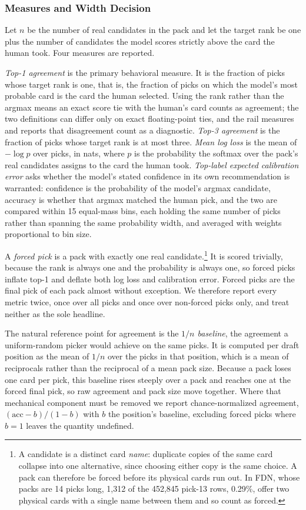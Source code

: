 \documentclass[11pt]{article}
\numberwithin{equation}{section}
\begin{document}
\subsubsection{Measures and Width Decision}
\label{sec:evaluation-measures}

Let $n$ be the number of real candidates in the pack and let the target rank be
one plus the number of candidates the model scores strictly above the card the
human took. Four measures are reported.

\emph{Top-1 agreement} is the primary behavioral measure. It is the fraction of
picks whose target rank is one, that is, the fraction of picks on which the
model's most probable card is the card the human selected. Using the rank rather
than the argmax means an exact score tie with the human's card counts as
agreement; the two definitions can differ only on exact floating-point ties, and
the rail measures and reports that disagreement count as a diagnostic.
\emph{Top-3 agreement} is the fraction of picks whose target rank is at most
three. \emph{Mean log loss} is the mean of $-\log p$ over picks, in nats, where
$p$ is the probability the softmax over the pack's real candidates assigns to
the card the human took. \emph{Top-label expected calibration error} asks
whether the model's stated confidence in its own recommendation is warranted:
confidence is the probability of the model's argmax candidate, accuracy is
whether that argmax matched the human pick, and the two are compared within 15
equal-mass bins, each holding the same number of picks rather than spanning the
same probability width, and averaged with weights proportional to bin size.

A \emph{forced pick} is a pack with exactly one real candidate.\footnote{A
candidate is a distinct card \emph{name}: duplicate copies of the same card
collapse into one alternative, since choosing either copy is the same choice. A
pack can therefore be forced before its physical cards run out. In FDN, whose
packs are 14 picks long, 1,312 of the 452,845 pick-13 rows, 0.29\%, offer two
physical cards with a single name between them and so count as forced.} It is scored
trivially, because the rank is always one and the probability is always one, so
forced picks inflate top-1 and deflate both log loss and calibration error.
Forced picks are the final pick of each pack almost without exception. We
therefore report every metric twice, once over all picks and once over
non-forced picks only, and treat neither as the sole headline.

The natural reference point for agreement is the \emph{$1/n$ baseline}, the
agreement a uniform-random picker would achieve on the same picks. It is
computed per draft position as the mean of $1/n$ over the picks in that
position, which is a mean of reciprocals rather than the reciprocal of a mean
pack size. Because a pack loses one card per pick, this baseline rises steeply
over a pack and reaches one at the forced final pick, so raw agreement and pack
size move together. Where that mechanical component must be removed we report
chance-normalized agreement, $(\mathrm{acc}-b)/(1-b)$ with $b$ the position's
baseline, excluding forced picks where $b=1$ leaves the quantity undefined.
\end{document}
